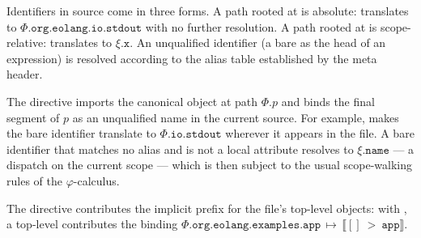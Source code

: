Identifiers in source come in three forms.
A path rooted at  is absolute:
   translates to
  \(\Phi.\mathtt{org}.\mathtt{eolang}.\mathtt{io}.\mathtt{stdout}\) with no
  further resolution.
A path rooted at \ff{\$} is scope-relative:
   translates to \(\xi.\mathtt{x}\).
An unqualified identifier (a bare  as the head of an expression)
  is resolved according to the alias table established by the meta
  header.

The directive  imports the canonical object at path
  \(\Phi.p\) and binds the final segment of \(p\) as an unqualified name
  in the current source.
For example,  makes the bare identifier 
  translate to \(\Phi.\mathtt{io}.\mathtt{stdout}\) wherever it appears
  in the file.
A bare identifier that matches no alias and is not a local attribute
  resolves to \(\xi.\mathtt{name}\) ---
  a dispatch on the current scope --- which is then subject to the
  usual scope-walking rules of the \(\varphi\)-calculus.

The  directive contributes the implicit prefix for the
  file's top-level objects:
  with , a top-level 
  contributes the binding
  \(\Phi.\mathtt{org}.\mathtt{eolang}.\mathtt{examples}.\mathtt{app}\,
    \mapsto\,\llbracket\mathtt{[]\ >\ app}\rrbracket\).
